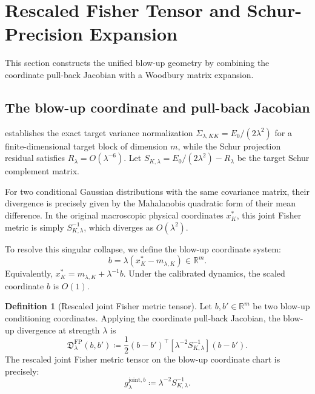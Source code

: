 \documentclass[11pt]{amsart}
\theoremstyle{plain}
\theoremstyle{definition}
\newtheorem{definition}[theorem]{Definition}
\theoremstyle{remark}
\begin{document}
    \section{Rescaled Fisher Tensor and Schur-Precision Expansion}
    \label{sec:fisher_geometry}

    This section constructs the unified blow-up geometry by combining the coordinate pull-back Jacobian with a Woodbury matrix expansion.

    \subsection{The blow-up coordinate and pull-back Jacobian}

     establishes the exact target variance normalization $\Sigma_{\lambda,KK} = E_0/(2\lambda^2)$ for a finite-dimensional target block of dimension $m$, while the Schur projection residual satisfies $R_\lambda = O(\lambda^{-6})$. Let $S_{K,\lambda} = E_0/(2\lambda^2) - R_\lambda$ be the target Schur complement matrix.

    For two conditional Gaussian distributions with the same covariance matrix, their divergence is precisely given by the Mahalanobis quadratic form of their mean difference. In the original macroscopic physical coordinates $x_K^*$, this joint Fisher metric is simply $S_{K,\lambda}^{-1}$, which diverges as $O(\lambda^2)$.

    To resolve this singular collapse, we define the blow-up coordinate system:
    \begin{equation}
        b = \lambda(x_K^* - m_{\lambda,K}) \in \mathbb{R}^m.
    \end{equation}
    Equivalently, $x_K^* = m_{\lambda,K} + \lambda^{-1}b$. Under the calibrated dynamics, the scaled coordinate $b$ is $O(1)$. 

    \begin{definition}[Rescaled joint Fisher metric tensor]
        \label{def:fp_divergence}
        Let $b,b'\in\mathbb{R}^m$ be two blow-up conditioning coordinates. Applying the coordinate pull-back Jacobian, the blow-up divergence at strength $\lambda$ is
        \begin{equation}
            \mathfrak{D}_\lambda^{\mathrm{FP}}(b,b')
            \coloneqq
            \frac12 (b-b')^\top \left[ \lambda^{-2} S_{K,\lambda}^{-1} \right] (b-b').
        \end{equation}
        The rescaled joint Fisher metric tensor on the blow-up coordinate chart is precisely:
        \begin{equation}
            g_{\lambda}^{\mathrm{joint},b} \coloneqq \lambda^{-2} S_{K,\lambda}^{-1}.
        \end{equation}
    \end{definition}
\end{document}
